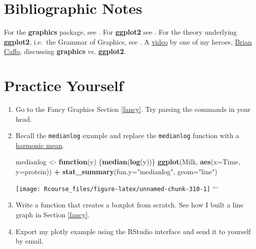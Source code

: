 \documentclass[]{book}
\newenvironment{Shaded}{\begin{snugshade}}{\end{snugshade}}
\newcommand{\KeywordTok}[1]{\textcolor[rgb]{0.13,0.29,0.53}{\textbf{#1}}}
\newcommand{\DataTypeTok}[1]{\textcolor[rgb]{0.13,0.29,0.53}{#1}}
\newcommand{\StringTok}[1]{\textcolor[rgb]{0.31,0.60,0.02}{#1}}
\newcommand{\ControlFlowTok}[1]{\textcolor[rgb]{0.13,0.29,0.53}{\textbf{#1}}}
\newcommand{\OperatorTok}[1]{\textcolor[rgb]{0.81,0.36,0.00}{\textbf{#1}}}
\newcommand{\NormalTok}[1]{#1}
\theoremstyle{definition}
\theoremstyle{definition}
\theoremstyle{definition}
\theoremstyle{remark}
\begin{document}
\section{Bibliographic Notes}\label{bibliographic-notes-10}

For the \textbf{graphics} package, see \citet{Rlanguage}. For
\textbf{ggplot2} see \citet{ggplot2}. For the theory underlying
\textbf{ggplot2}, i.e.~the Grammar of Graphics, see
\citet{wilkinson2006grammar}. A
\href{https://www.youtube.com/watch?v=9Objw9Tvhb4\&feature=youtu.be}{video}
by one of my heroes, \href{http://www.bcaffo.com/}{Brian Caffo},
discussing \textbf{graphics} vs. \textbf{ggplot2}.

\section{Practice Yourself}\label{practice-yourself-8}

\begin{enumerate}
\def\labelenumi{\arabic{enumi}.}
\item
  Go to the Fancy Graphics Section \ref{fancy}. Try parsing the commands
  in your head.
\item
  Recall the \texttt{medianlog} example and replace the
  \texttt{medianlog} function with a
  \href{https://en.wikipedia.org/wiki/Harmonic_mean}{harmonic mean}.

\begin{Shaded}
\begin{Highlighting}[]
\NormalTok{medianlog <-}\StringTok{ }\ControlFlowTok{function}\NormalTok{(y) \{}\KeywordTok{median}\NormalTok{(}\KeywordTok{log}\NormalTok{(y))\}}
\KeywordTok{ggplot}\NormalTok{(Milk, }\KeywordTok{aes}\NormalTok{(}\DataTypeTok{x=}\NormalTok{Time, }\DataTypeTok{y=}\NormalTok{protein)) }\OperatorTok{+}
\StringTok{  }\KeywordTok{stat_summary}\NormalTok{(}\DataTypeTok{fun.y=}\StringTok{"medianlog"}\NormalTok{, }\DataTypeTok{geom=}\StringTok{"line"}\NormalTok{)}
\end{Highlighting}
\end{Shaded}

  \texttt{[image: Rcourse\_files/figure-latex/unnamed-chunk-310-1]}
  ```
\item
  Write a function that creates a boxplot from scratch. See how I built
  a line graph in Section \ref{fancy}.
\item
  Export my plotly example using the RStudio interface and send it to
  yourself by email.
\end{enumerate}
\end{document}

